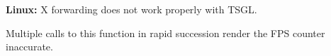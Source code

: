 
\begin{DoxyRefList}
\item[\label{bug__bug000002}%
\Hypertarget{bug__bug000002}%
Class \hyperlink{classtsgl_1_1_canvas}{tsgl\+:\+:Canvas} ]{\bfseries Linux\+:} X forwarding does not work properly with T\+S\+GL.  
\item[\label{bug__bug000001}%
\Hypertarget{bug__bug000001}%
Member \hyperlink{classtsgl_1_1_canvas_ac035f43763b198f6915a0772973a5ea9}{tsgl\+:\+:Canvas\+:\+:take\+Screen\+Shot} ()]Multiple calls to this function in rapid succession render the F\+PS counter inaccurate. 
\end{DoxyRefList}